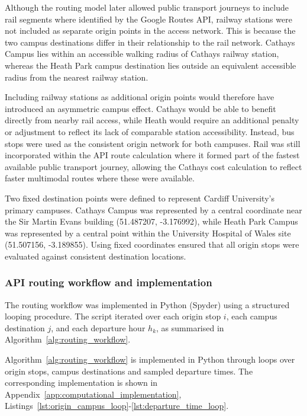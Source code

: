 \documentclass[11pt,a4paper]{article}
\begin{document}
Although the routing model later allowed public transport journeys to include rail segments where identified by the Google Routes API, railway stations were not included as separate origin points in the access network. This is because the two campus destinations differ in their relationship to the rail network. Cathays Campus lies within an accessible walking radius of Cathays railway station, whereas the Heath Park campus destination lies outside an equivalent accessible radius from the nearest railway station.

Including railway stations as additional origin points would therefore have introduced an asymmetric campus effect. Cathays would be able to benefit directly from nearby rail access, while Heath would require an additional penalty or adjustment to reflect its lack of comparable station accessibility. Instead, bus stops were used as the consistent origin network for both campuses. Rail was still incorporated within the API route calculation where it formed part of the fastest available public transport journey, allowing the Cathays cost calculation to reflect faster multimodal routes where these were available.

Two fixed destination points were defined to represent Cardiff University’s primary campuses. Cathays Campus was represented by a central coordinate near the Sir Martin Evans building (51.487207, -3.176992), while Heath Park Campus was represented by a central point within the University Hospital of Wales site (51.507156, -3.189855). Using fixed coordinates ensured that all origin stops were evaluated against consistent destination locations.
\subsubsection{API routing workflow and implementation}

The routing workflow was implemented in Python (Spyder) using a structured looping procedure. The script iterated over each origin stop \(i\), each campus destination \(j\), and each departure hour \(h_k\), as summarised in Algorithm~\ref{alg:routing_workflow}. 

\begin{algorithm}[H]
\caption{Routing workflow for public transport accessibility analysis}
\label{alg:routing_workflow}





\end{algorithm}
Algorithm~\ref{alg:routing_workflow} is implemented in Python through loops over origin stops, campus destinations and sampled departure times. The corresponding implementation is shown in Appendix~\ref{app:computational_implementation}, Listings~\ref{lst:origin_campus_loop}-\ref{lst:departure_time_loop}.
\end{document}

